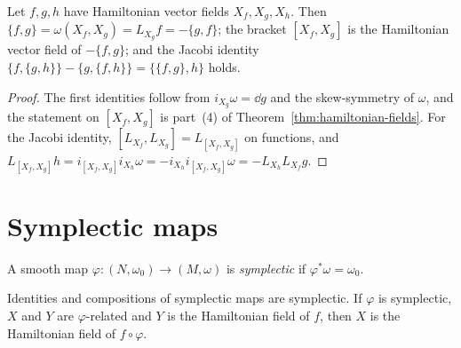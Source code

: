 \begin{theorem}
  \label{thm:poisson}
  \leanok
  Let $f, g, h$ have Hamiltonian vector fields $X_f, X_g, X_h$. Then
  $\{f, g\} = \omega(X_f, X_g) = L_{X_g} f = -\{g, f\}$; the bracket $[X_f, X_g]$ is the
  Hamiltonian vector field of $-\{f, g\}$; and the Jacobi identity
  $\{f, \{g, h\}\} - \{g, \{f, h\}\} = \{\{f, g\}, h\}$ holds.
\end{theorem}

\begin{proof}
  \leanok
  The first identities follow from $i_{X_g}\omega = \dd g$ and the skew-symmetry of $\omega$, and
  the statement on $[X_f, X_g]$ is part~(4) of Theorem~\ref{thm:hamiltonian-fields}. For the
  Jacobi identity, $[L_{X_f}, L_{X_g}] = L_{[X_f, X_g]}$ on functions, and
  $L_{[X_f, X_g]} h = i_{[X_f, X_g]} i_{X_h}\omega = -i_{X_h} i_{[X_f, X_g]}\omega
  = -L_{X_h} L_{X_f} g$.
\end{proof}

\section{Symplectic maps}

\begin{definition}
  \label{def:symplectic-map}
  \leanok
  A smooth map $\varphi \colon (N, \omega_0) \to (M, \omega)$ is \emph{symplectic} if
  $\varphi^*\omega = \omega_0$.
\end{definition}

\begin{proposition}
  \label{prop:symplectic-maps}
  \leanok
  Identities and compositions of symplectic maps are symplectic. If $\varphi$ is symplectic,
  $X$ and $Y$ are $\varphi$-related and $Y$ is the Hamiltonian field of $f$, then $X$ is the
  Hamiltonian field of $f \circ \varphi$.
\end{proposition}

